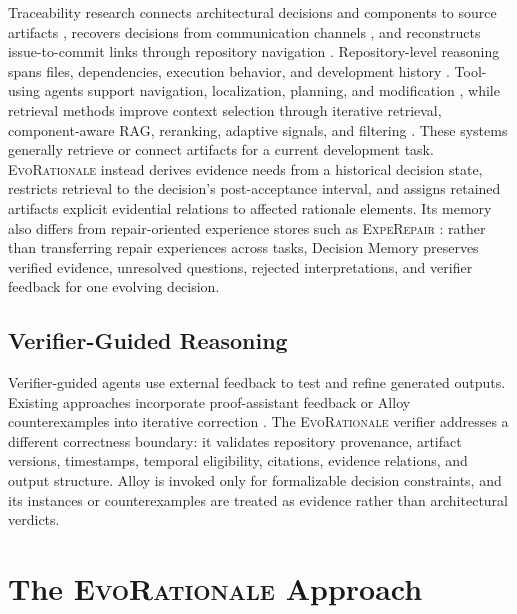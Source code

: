 \documentclass[10pt,conference]{IEEEtran}
\begin{document}
Traceability research connects architectural decisions and components to source artifacts \cite{Fuchss2025Traceability}, recovers decisions from communication channels \cite{Soliman2024MailingLists}, and reconstructs issue-to-commit links through repository navigation \cite{Akhavan2026LinkAnchor}. Repository-level reasoning spans files, dependencies, execution behavior, and development history \cite{Jimenez2024SWEBench,Wang2026RepoReasoner}. Tool-using agents support navigation, localization, planning, and modification \cite{Yang2024SWEAgent,Zhang2024AutoCodeRover,Bairi2024CodePlan,Chen2025LocAgent}, while retrieval methods improve context selection through iterative retrieval, component-aware RAG, reranking, adaptive signals, and filtering \cite{Zhang2023RepoCoder,Ke2026RAG,Zhang2025CodeRAG,Shi2026AIRCoder,Huo2026RepoShapley}. These systems generally retrieve or connect artifacts for a current development task. \textsc{EvoRationale} instead derives evidence needs from a historical decision state, restricts retrieval to the decision's post-acceptance interval, and assigns retained artifacts explicit evidential relations to affected rationale elements. Its memory also differs from repair-oriented experience stores such as \textsc{ExpeRepair} \cite{Mu2026ExpeRepair}: rather than transferring repair experiences across tasks, Decision Memory preserves verified evidence, unresolved questions, rejected interpretations, and verifier feedback for one evolving decision.
\subsection{Verifier-Guided Reasoning}

Verifier-guided agents use external feedback to test and refine generated outputs. Existing approaches incorporate proof-assistant feedback or Alloy counterexamples into iterative correction \cite{Tu2026AgenticVerification,Alhanahnah2025Alloy}. The \textsc{EvoRationale} verifier addresses a different correctness boundary: it validates repository provenance, artifact versions, timestamps, temporal eligibility, citations, evidence relations, and output structure. Alloy is invoked only for formalizable decision constraints, and its instances or counterexamples are treated as evidence rather than architectural verdicts.





\section{The \textsc{EvoRationale} Approach}
\label{sec:approach}
\end{document}
